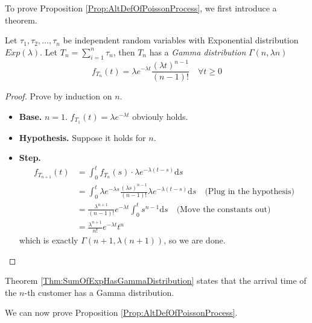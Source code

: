     To prove Proposition \ref{Prop:AltDefOfPoissonProcess}, we first introduce a theorem.

    \begin{theorem}\label{Thm:SumOfExpHasGammaDistribution}
        Let $\tau_1, \tau_2, \dots, \tau_n$ be independent random variables with Exponential distribution $Exp(\lambda)$. Let $T_n = \sum_{i=1}^n\tau_n$, then $T_n$ has a \emph{Gamma distribution} $\Gamma(n, \lambda n)$
        \[ f_{T_n}(t) = \lambda e^{-\lambda t}\frac{(\lambda t)^{n-1}}{(n-1)!} \quad \forall t \ge 0 \]
    \end{theorem}
    \begin{proof}
        Prove by induction on $n$.
        \begin{itemize}
            \item \textbf{Base. } $n=1$. $f_{T_1}(t) = \lambda e^{-\lambda t}$ obviouly holds.
            \item \textbf{Hypothesis. } Suppose it holds for $n$.
            \item \textbf{Step. }
            \begin{align*}
                f_{T_{n+1}}(t) &= \int_0^t f_{T_n}(s)\cdot\lambda e^{-\lambda(t-s)}\mathrm{d}s\\
                &= \int_0^t \lambda e^{-\lambda s}\frac{(\lambda s)^{n-1}}{(n-1)!}\lambda e^{-\lambda(t-s)}\mathrm{d}s \quad \text{(Plug in the hypothesis)}\\
                &= \frac{\lambda^{n+1}}{(n-1)!}e^{-\lambda t}\int_0^t s^{n-1}\mathrm{d}s \quad \text{(Move the constants out)}\\
                &= \frac{\lambda^{n+1}}{n!}e^{-\lambda t}t^n
            \end{align*}
            which is exactly $\Gamma(n+1, \lambda(n+1))$, so we are done.
        \end{itemize}
    \end{proof}
    \begin{remark}
        Theorem \ref{Thm:SumOfExpHasGammaDistribution} states that the arrival time of the $n$-th customer has a Gamma distribution.
    \end{remark}

    We can now prove Proposition \ref{Prop:AltDefOfPoissonProcess}.
